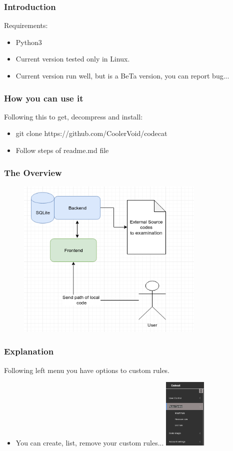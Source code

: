 \documentclass[serif,mathserif]{beamer}
\begin{document}
\begin{frame}
  \frametitle{Introduction}
  Requirements:
  \begin{itemize}
  \item  Python3 
  \item  Current version tested only in Linux.
  \item  Current version run well, but is a BeTa version, you can report bug...
  \end{itemize}
\end{frame}


\begin{frame}
  \frametitle{How you can use it}
  Following this to get, decompress and install:
  \begin{itemize}
  \item git clone https://github.com/CoolerVoid/codecat
  \item Follow steps of readme.md file
  \end{itemize}
\end{frame}



\begin{frame}
  \frametitle{The Overview}
  \begin{figure}[]    
    \centering
    \includegraphics[width=9cm]{images/diagram0.png} 
  \end{figure}
\end{frame}


\begin{frame}
  \frametitle{Explanation}
  Following left menu you have options to custom rules.
  \begin{itemize}
  \item You can create, list, remove your custom rules...
  \includegraphics[width=2cm]{images/menu1.png} 
  \end{itemize}
\end{frame}
\end{document}
